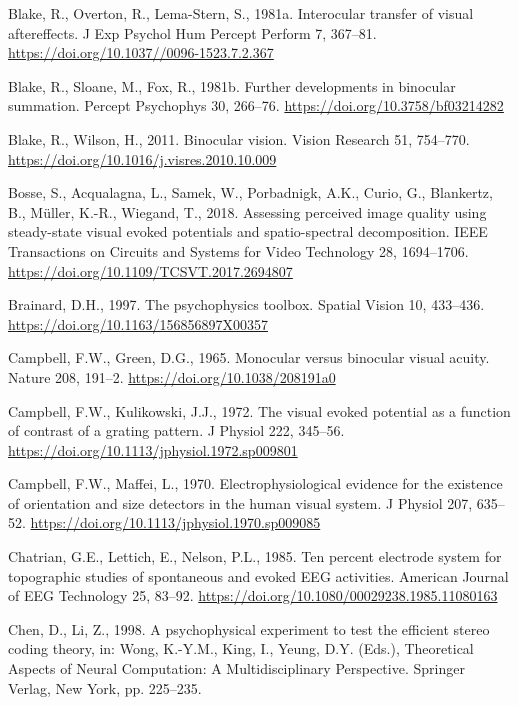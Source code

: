\documentclass[review,
  12pt,
]{elsarticle}
\newlength{\cslhangindent}
\newenvironment{CSLReferences}[2] %
 {\begin{list}{}{%
  \setlength{\itemindent}{0pt}
  \setlength{\leftmargin}{0pt}
  \setlength{\parsep}{0pt}
  \ifodd #1
   \setlength{\leftmargin}{\cslhangindent}
   \setlength{\itemindent}{-1\cslhangindent}
  \fi
  \setlength{\itemsep}{#2\baselineskip}}}
 {\end{list}}
\begin{document}
\begin{CSLReferences}{1}{0}
Blake, R., Overton, R., Lema-Stern, S., 1981a. Interocular transfer of
visual aftereffects. J Exp Psychol Hum Percept Perform 7, 367--81.
\url{https://doi.org/10.1037//0096-1523.7.2.367}

Blake, R., Sloane, M., Fox, R., 1981b. Further developments in binocular
summation. Percept Psychophys 30, 266--76.
\url{https://doi.org/10.3758/bf03214282}

Blake, R., Wilson, H., 2011. Binocular vision. Vision Research 51,
754--770. \url{https://doi.org/10.1016/j.visres.2010.10.009}

Bosse, S., Acqualagna, L., Samek, W., Porbadnigk, A.K., Curio, G.,
Blankertz, B., Müller, K.-R., Wiegand, T., 2018. Assessing perceived
image quality using steady-state visual evoked potentials and
spatio-spectral decomposition. IEEE Transactions on Circuits and Systems
for Video Technology 28, 1694--1706.
\url{https://doi.org/10.1109/TCSVT.2017.2694807}

Brainard, D.H., 1997. The psychophysics toolbox. Spatial Vision 10,
433--436. \url{https://doi.org/10.1163/156856897X00357}

Campbell, F.W., Green, D.G., 1965. Monocular versus binocular visual
acuity. Nature 208, 191--2. \url{https://doi.org/10.1038/208191a0}

Campbell, F.W., Kulikowski, J.J., 1972. The visual evoked potential as a
function of contrast of a grating pattern. J Physiol 222, 345--56.
\url{https://doi.org/10.1113/jphysiol.1972.sp009801}

Campbell, F.W., Maffei, L., 1970. Electrophysiological evidence for the
existence of orientation and size detectors in the human visual system.
J Physiol 207, 635--52.
\url{https://doi.org/10.1113/jphysiol.1970.sp009085}

Chatrian, G.E., Lettich, E., Nelson, P.L., 1985. Ten percent electrode
system for topographic studies of spontaneous and evoked EEG activities.
American Journal of EEG Technology 25, 83--92.
\url{https://doi.org/10.1080/00029238.1985.11080163}

Chen, D., Li, Z., 1998. A psychophysical experiment to test the
efficient stereo coding theory, in: Wong, K.-Y.M., King, I., Yeung, D.Y.
(Eds.), Theoretical Aspects of Neural Computation: A Multidisciplinary
Perspective. Springer Verlag, New York, pp. 225--235.


\end{CSLReferences}
\end{document}
